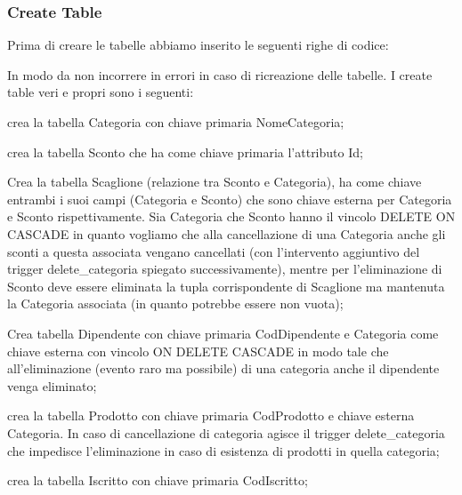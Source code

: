 \subsubsection{Create Table}
Prima di creare le tabelle abbiamo inserito le seguenti righe di codice:


In modo da non incorrere in errori in caso di ricreazione delle tabelle. \newline
I create table veri e propri sono i seguenti:


crea la tabella Categoria con chiave primaria NomeCategoria;


crea la tabella Sconto che ha come chiave primaria l'attributo Id;


Crea la tabella Scaglione (relazione tra Sconto e Categoria), ha come chiave entrambi i suoi campi (Categoria e Sconto) che sono chiave esterna per Categoria e Sconto rispettivamente. Sia Categoria che Sconto hanno il vincolo DELETE ON CASCADE in quanto vogliamo che alla cancellazione di una Categoria anche gli sconti a questa associata vengano cancellati (con l'intervento aggiuntivo del trigger delete\_categoria spiegato successivamente), mentre per l'eliminazione di Sconto deve essere eliminata la tupla corrispondente di Scaglione ma mantenuta la Categoria associata (in quanto potrebbe essere non vuota);


Crea tabella Dipendente con chiave primaria CodDipendente e Categoria come chiave esterna con vincolo ON DELETE CASCADE in modo tale che all'eliminazione (evento raro ma possibile) di una categoria anche il dipendente venga eliminato;


crea la tabella Prodotto con chiave primaria CodProdotto e chiave esterna Categoria. In caso di cancellazione di categoria agisce il trigger delete\_categoria che impedisce l'eliminazione in caso di esistenza di prodotti in quella categoria;


crea la tabella Iscritto con chiave primaria CodIscritto;

